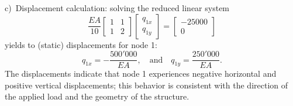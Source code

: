 \documentclass[12pt]{article}
\begin{document}
\vspace{0.3cm}
\noindent c)\ Displacement calculation: solving the reduced linear system
\[
    \frac{EA}{10}\begin{bmatrix} 1 & 1 \\ 1 & 2 \end{bmatrix} \begin{bmatrix} q_{1x} \\ q_{1y} \end{bmatrix} = \begin{bmatrix} -25000 \\ 0 \end{bmatrix}
\]
yields to (static) displacements for node 1:
\[
    q_{1x} = -\frac{500'000}{EA}, \quad\text{and}\quad q_{1y} = \frac{250'000}{EA}.
\]
The displacements indicate that node 1 experiences negative horizontal and positive vertical displacements; this behavior is consistent with the direction of the applied load and the geometry of the structure.
\end{document}
